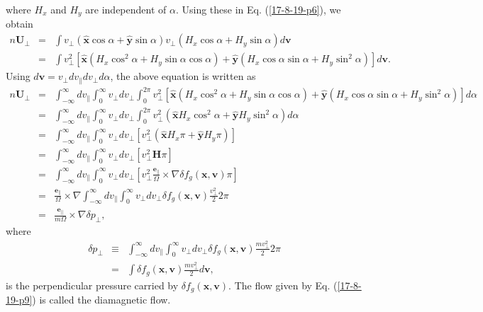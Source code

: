 \documentclass{llncs}
\begin{document}
where $H_x$ and $H_y$ are independent of $\alpha$. Using these in Eq.
(\ref{17-8-19-p6}), we obtain
\begin{eqnarray}
  n\mathbf{U}_{\perp} & = & \int v_{\perp} (\hat{\mathbf{x}} \cos \alpha +
  \hat{\mathbf{y}} \sin \alpha) v_{\perp} (H_x \cos \alpha + H_y \sin \alpha)
  d\mathbf{v} \nonumber\\
  & = & \int v_{\perp}^2 [\hat{\mathbf{x}} (H_x \cos^2 \alpha + H_y \sin
  \alpha \cos \alpha) + \hat{\mathbf{y}} (H_x \cos \alpha \sin \alpha + H_y
  \sin^2 \alpha)] d\mathbf{v}. 
\end{eqnarray}
Using $d\mathbf{v}= v_{\perp} d v_{\parallel} d v_{\perp} d \alpha$, the above
equation is written as
\begin{eqnarray}
  n\mathbf{U}_{\perp} & = & \int_{- \infty}^{\infty} d v_{\parallel}
  \int_0^{\infty} v_{\perp} d v_{\perp} \int_0^{2 \pi} v_{\perp}^2
  [\hat{\mathbf{x}} (H_x \cos^2 \alpha + H_y \sin \alpha \cos \alpha) +
  \hat{\mathbf{y}} (H_x \cos \alpha \sin \alpha + H_y \sin^2 \alpha)] d \alpha
  \nonumber\\
  & = & \int_{- \infty}^{\infty} d v_{\parallel} \int_0^{\infty} v_{\perp} d
  v_{\perp} \int_0^{2 \pi} v_{\perp}^2 (\hat{\mathbf{x}} H_x \cos^2 \alpha +
  \hat{\mathbf{y}} H_y \sin^2 \alpha) d \alpha \nonumber\\
  & = & \int_{- \infty}^{\infty} d v_{\parallel} \int_0^{\infty} v_{\perp} d
  v_{\perp} [v_{\perp}^2 (\hat{\mathbf{x}} H_x \pi + \hat{\mathbf{y}} H_y
  \pi)] \nonumber\\
  & = & \int_{- \infty}^{\infty} d v_{\parallel} \int_0^{\infty} v_{\perp} d
  v_{\perp} [v_{\perp}^2 \mathbf{H} \pi] \nonumber\\
  & = & \int_{- \infty}^{\infty} d v_{\parallel} \int_0^{\infty} v_{\perp} d
  v_{\perp} [v_{\perp}^2 \frac{\mathbf{e}_{\parallel}}{\Omega} \times \nabla
  \delta f_g (\mathbf{x}, \mathbf{v}) \pi] \nonumber\\
  & = & \frac{\mathbf{e}_{\parallel}}{\Omega} \times \nabla \int_{-
  \infty}^{\infty} d v_{\parallel} \int_0^{\infty} v_{\perp} d v_{\perp}
  \delta f_g (\mathbf{x}, \mathbf{v}) \frac{v_{\perp}^2}{2} 2 \pi \nonumber\\
  & = & \frac{\mathbf{e}_{\parallel}}{m \Omega} \times \nabla \delta
  p_{\perp},  \label{17-8-19-p9}
\end{eqnarray}
where
\begin{eqnarray}
  \delta p_{\perp} & \equiv & \int_{- \infty}^{\infty} d v_{\parallel}
  \int_0^{\infty} v_{\perp} d v_{\perp} \delta f_g (\mathbf{x}, \mathbf{v})
  \frac{m v_{\perp}^2}{2} 2 \pi \nonumber\\
  & = & \int \delta f_g (\mathbf{x}, \mathbf{v}) \frac{m v_{\perp}^2}{2}
  d\mathbf{v}, 
\end{eqnarray}
is the perpendicular pressure carried by $\delta f_g (\mathbf{x},
\mathbf{v})$. The flow given by Eq. (\ref{17-8-19-p9}) is called the
diamagnetic flow.
\end{document}
